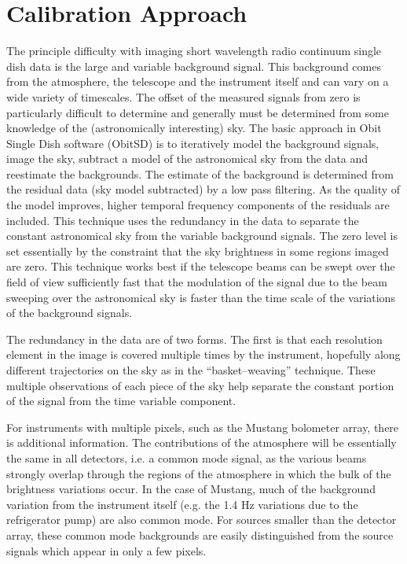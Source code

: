 \documentclass[11pt]{report}
\begin{document}
\section{Calibration Approach\label{Calibration}}
The principle difficulty with imaging short wavelength radio continuum
single dish data is the large and variable background signal.
This background comes from the atmosphere, the telescope and the instrument
itself and can vary on a wide variety of timescales.
The offset of the measured signals from zero is particularly difficult
to determine and generally must be determined from some knowledge of
the (astronomically interesting) sky.
The basic approach in Obit Single Dish software (ObitSD) is to iteratively
model the background signals, image the sky, subtract a model of the
astronomical sky from the data and reestimate the backgrounds.
The estimate of the background is determined from the residual data
(sky model subtracted) by a low pass filtering.
As the quality of the model improves, higher temporal frequency
components of the residuals are included.
This technique uses the redundancy in the data to separate the
constant astronomical sky from the variable background signals.
The zero level is set essentially by the constraint that the sky
brightness in some regions imaged are zero.
This technique works best if the telescope beams can be swept over the
field of view sufficiently fast that the modulation of the signal due
to the beam sweeping over the astronomical sky is faster than the time
scale of the variations of the background signals.

The redundancy in the data are of two forms.
The first is that each resolution element in the image is covered
multiple times by the instrument, hopefully along different
trajectories on the sky as in the ``basket--weaving'' technique.
These multiple observations of each piece of the sky help separate
the constant portion of the signal from the time variable component.

For instruments with multiple pixels, such as the Mustang bolometer
array, there is additional information.
The contributions of the atmosphere will be essentially the same in
all detectors, i.e. a common mode signal, as the various beams strongly
overlap through the regions of the atmosphere in which the bulk of the
brightness variations occur.
In the case of Mustang, much of the background variation from the
instrument itself (e.g. the 1.4 Hz variations due to the refrigerator
pump) are also common mode.
For sources smaller than the detector array, these common mode
backgrounds are easily distinguished from the source signals which
appear in only a few pixels.
\end{document}
